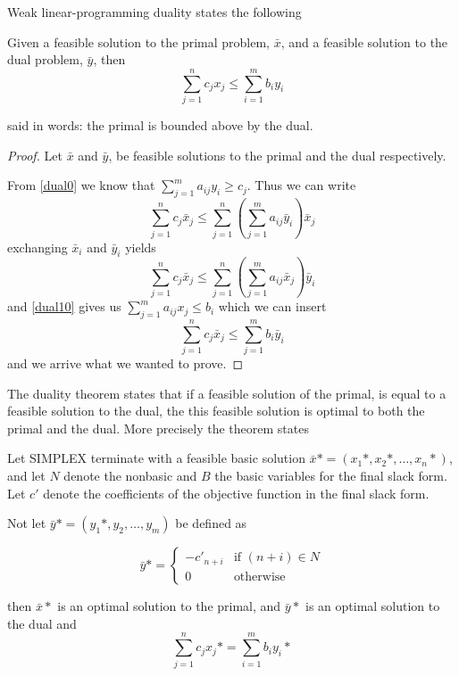 \documentclass[10pt]{article}
\begin{document}
Weak linear-programming duality states the following
\begin{theorem}
  Given a feasible solution to the primal problem, $\bar{x}$, and a feasible solution to the dual problem, $\bar{y}$, then
  \begin{equation}
  \sum_{j=1}^n c_jx_j \leq \sum_{i=1}^m b_iy_i
  \end{equation}  
\end{theorem}
said in words: the primal is bounded above by the dual.

\begin{proof}
Let $\bar{x}$ and $\bar{y}$, be feasible solutions to the primal and the dual respectively.

From \ref{dual0} we know that $\sum_{j=1}^m a_{ij}y_i \geq c_j$. Thus we can write
\begin{equation}
\sum_{j=1}^n c_j\bar{x}_j \leq  \sum_{j=1}^n \left (\sum_{j=1}^m a_{ij}\bar{y}_i\right)\bar{x}_j   
\end{equation}
exchanging $\bar{x}_i$ and $\bar{y}_i$ yields
\begin{equation}
\sum_{j=1}^n c_j\bar{x}_j \leq  \sum_{j=1}^n \left (\sum_{j=1}^m a_{ij}\bar{x}_j\right)\bar{y}_i
\end{equation}
and \ref{dual10} gives us $\sum_{j=1}^m a_{ij}x_j \leq b_i$ which we can insert
\begin{equation}
\sum_{j=1}^n c_j\bar{x}_j \leq  \sum_{j=1}^m b_i\bar{y}_i
\end{equation}
and we arrive what we wanted to prove.
\end{proof}

The duality theorem states that if a feasible solution of the primal, is equal to a feasible solution to the dual, the this feasible solution is optimal to both the primal and the dual. More precisely the theorem states

\begin{theorem}
Let SIMPLEX terminate with a feasible basic solution $\bar{x}*=(x_1*,x_2*,\ldots,x_n*)$, and let $N$ denote the nonbasic and $B$ the basic variables for the final slack form. Let $c'$ denote the coefficients of the objective function in the final slack form. 

Not let $\bar{y}* = (y_1*,y_2,\ldots,y_m)$ be defined as

\begin{equation} 
\bar{y}* = 
\left\{
\begin{array}{rl} 
  -c'_{n+i} & \text{if } (n+i) \in N \\
   0 & \text{otherwise}
\end{array} 
\right. 
\end{equation} 

then $\bar{x}*$ is an optimal solution to the primal, and $\bar{y}*$ is an optimal solution to the dual and
\begin{equation}
  \sum_{j=1}^n c_jx_j* = \sum_{i=1}^m b_iy_i*
\end{equation}
\end{theorem}
\end{document}
